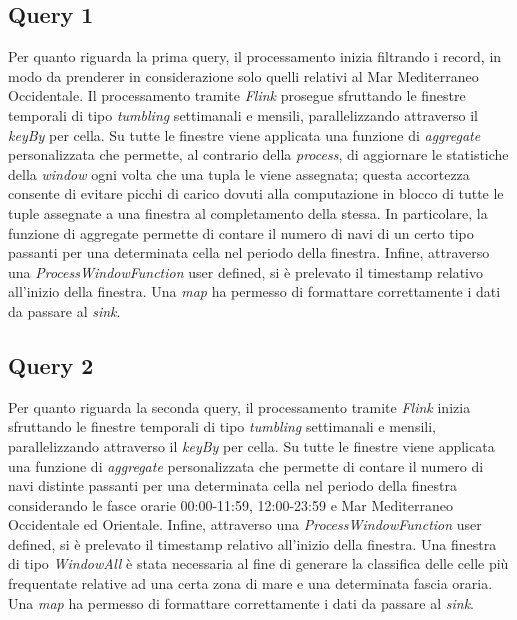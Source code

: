 \documentclass[conference]{IEEEtran}
\begin{document}
\subsection*{\textbf{Query 1}}
Per quanto riguarda la prima query, il processamento inizia filtrando i record, in modo da prenderer in considerazione solo quelli relativi al Mar Mediterraneo Occidentale.
Il processamento tramite \emph{Flink} prosegue sfruttando le
finestre temporali di tipo \emph{tumbling}
settimanali e mensili, parallelizzando attraverso il \emph{keyBy} per cella. Su tutte le finestre viene applicata una funzione di \emph{aggregate} personalizzata che permette, al contrario della \emph{process},​ di aggiornare le statistiche della \emph{​window} ogni volta
che una tupla le viene assegnata; questa accortezza
consente di evitare picchi di carico dovuti alla computazione in blocco di tutte le tuple assegnate a una finestra al completamento della stessa. In particolare, la funzione di aggregate permette di contare il numero di navi di un certo tipo passanti per una determinata cella nel periodo della finestra. Infine, attraverso una \emph{ProcessWindowFunction} user defined, si \`{e} prelevato il timestamp relativo all'inizio della finestra. Una \emph{map} ha permesso di formattare correttamente i dati da passare al \emph{sink}.


\subsection*{\textbf{Query 2}}
Per quanto riguarda la seconda query, il processamento tramite \emph{Flink} inizia sfruttando le
finestre temporali di tipo \emph{tumbling}
settimanali e mensili, parallelizzando attraverso il \emph{keyBy} per cella. Su tutte le finestre viene applicata una funzione di \emph{aggregate} personalizzata che permette di contare il numero di navi distinte passanti per una determinata cella nel periodo della finestra considerando le fasce orarie 00:00-11:59, 12:00-23:59 e Mar Mediterraneo Occidentale ed Orientale. Infine, attraverso una \emph{ProcessWindowFunction} user defined, si \`{e} prelevato il timestamp relativo all'inizio della finestra. Una finestra di tipo \emph{WindowAll} \`{e} stata necessaria al fine di generare la classifica delle celle pi\`{u} frequentate relative ad una certa zona di mare e una determinata fascia oraria. Una \emph{map} ha permesso di formattare correttamente i dati da passare al \emph{sink}.
\end{document}
